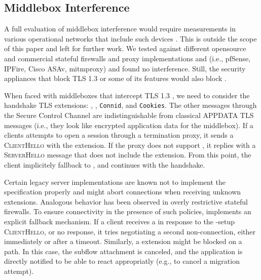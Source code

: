 \subsection{Middlebox Interference}

A full evaluation of middlebox interference would require measurements in various operational networks that include such devices \cite{honda2011still,raman2020measuring,o2016tls}. This is outside the scope of this paper and left for further work.
We tested \tcpls against different opensource and commercial stateful
firewalls and proxy implementations and (i.e., pfSense, IPFire, Cisco ASAv, mitmproxy) and found no interference. Still, the security appliances that block
TLS 1.3 or some of its features \cite{lee2019matls,Bock_China,raman2020measuring} would also block \tcpls.


When faced with middleboxes that intercept TLS 1.3
\cite{Bock_China,raman2020measuring}, we need to consider the \tcpls handshake
TLS extensions: \tcpls, \join, \texttt{Connid}, and \texttt{Cookies}. The other
\tcpls messages through the Secure Control Channel are indistinguishable from
classical APPDATA TLS messages (i.e., they look like encrypted application data
for the middlebox). If a clients attempts to open a \tcpls session
through a \tls termination proxy, it sends a \textsc{ClientHello} with the
\tcpls extension.  If the proxy does not support \tcpls, it replies with a
\textsc{ServerHello} message that does not include the \tcpls extension. From
this point, the client implicitely fallback to \tls, and continues with the
handshake.

Certain legacy \tls server implementations are known not to implement the \tls
specification properly and might abort connections when receiving unknown \tls
extensions. Analogous behavior has been observed in overly restrictive stateful
firewalls. To ensure connectivity in the presence of such policies, \tcpls
implements an explicit fallback mechanism. If a client receives a \tcp \rst in
response to the \tcpls-setup \textsc{ClientHello}, or no response, it
tries negotiating a second non-\tcpls \tls connection, either
immediately or after a timeout. Similarly, a \tcpls \join extension might be
blocked on a path. In this case, the subflow attachment is canceled, and
the application is directly notified to be able to react appropriatly (e.g.,
to cancel a migration attempt).

